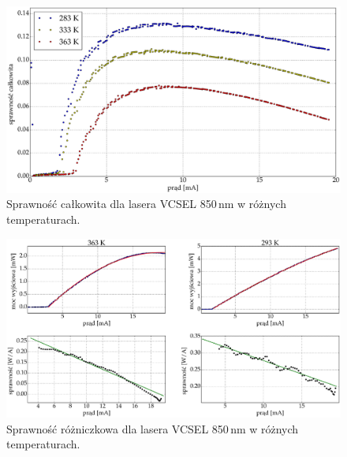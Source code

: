 \begin{figure}
\center
  \includegraphics[scale=0.30]{plot_vcsel_850/plot_eff_wall.eps}
  \caption{Sprawność całkowita dla lasera VCSEL 850\,nm w różnych temperaturach.}
  \label{vcsel_850_rys_8}
\end{figure}
\begin{figure}
\center
  \includegraphics[scale=0.30]{plot_vcsel_850/plot_eff_2.eps}
  \caption{Sprawność różniczkowa dla lasera VCSEL 850\,nm w różnych temperaturach.}
  \label{vcsel_850_rys_9}
\end{figure}
\newpage
